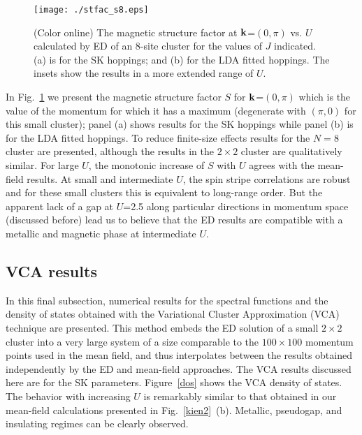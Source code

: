 \documentclass[aps,prb,superscriptaddress,preprintnumbers,
showpacs,legalpaper,twoside,twocolumn,amsmath,amssymb]{revtex4}
\begin{document}
\begin{figure}[thbp]
\begin{center}
\texttt{[image: ./stfac\_s8.eps]}
\vskip -0.3cm
\caption{(Color online) The magnetic structure factor at ${\bf k}$=$(0,\pi)$
vs. $U$ calculated by ED of an 8-site cluster
 for the values of $J$ indicated. (a) is for the SK hoppings;\cite{daghofer}
and (b) for the LDA fitted
hoppings.\cite{scalapino}
The insets show the results in a more extended range of $U$.}
\vskip -0.3cm
\label{struc_s8}
\end{center}
\end{figure}

In Fig.~\ref{struc_s8} we present the magnetic structure factor $S$ for
${\bf k}$=$(0,\pi)$ which is the value of the momentum for which it has a
maximum (degenerate with $(\pi,0)$ for this small cluster);
panel (a) shows results for the SK hoppings\cite{daghofer}
while panel (b) is for the LDA fitted hoppings.\cite{scalapino}
To reduce finite-size effects results for the
$N=8$ cluster are presented, although the results in the $2\times 2$ cluster are qualitatively
similar. For large $U$, the monotonic increase of $S$ with $U$ agrees with
the mean-field results. At small and intermediate $U$, the spin stripe correlations
are robust and for these small clusters this is equivalent to long-range order.
But the apparent lack of a gap at $U$=2.5 along particular directions in momentum
space (discussed before) lead us to believe that the ED results are compatible
with a metallic and magnetic phase at intermediate $U$.






\subsection{VCA results}


In this final subsection, numerical results for the spectral functions
and the density of states obtained with the Variational Cluster Approximation (VCA)
technique\cite{Aic03,Pot03} are presented.
This method embeds the ED solution of a small $2\times 2$
cluster into a very large system of a size comparable to the
$100\times 100$ momentum points used in the mean field, and thus
interpolates between the results obtained independently by the ED and
mean-field approaches.
The VCA results discussed here are for the SK parameters.\cite{daghofer}
Figure~\ref{dos} shows the VCA density of states. The
behavior with increasing $U$ is remarkably similar to that obtained in
our mean-field calculations presented in Fig.~\ref{kien2}~(b). Metallic, pseudogap,
and insulating regimes can be clearly observed.
\end{document}
